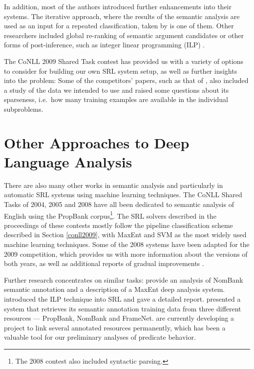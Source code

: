 \documentclass[12pt,notitlepage,a4paper]{report}
\begin{document}
In addition, most of the authors introduced further enhancements into their systems. The iterative approach, where the results of the semantic analysis are used as an input for a repeated classification, taken by \citet{chen09} is one of them. Other researchers included global re-ranking of semantic argument candidates \citep{nugues09} or other forms of post-inference, such as integer linear programming (ILP)  \citep{che09}.

The CoNLL 2009 Shared Task contest has provided us with a variety of options to consider for building our own SRL system setup, as well as further insights into the problem: Some of the competitors' papers, such as that of \citet{zeman09}, also included a study of the data we intended to use and raised some questions about its sparseness, i.e.\ how many training examples are available in the individual subproblems.

\section{Other Approaches to Deep Language Analysis}\label{related-other}

There are also many other works in semantic analysis and particularly in automatic SRL systems using machine learning techniques. The CoNLL Shared Tasks of 2004, 2005 \citep{carreras04,carreras05} and 2008 \citep{surdeanu08} have all been dedicated to semantic analysis of English using the PropBank corpus\footnote{The 2008 contest also included syntactic parsing.}. The SRL solvers described in the proceedings of these contests mostly follow the pipeline classification scheme described in Section \ref{conll2009}, with MaxEnt and SVM as the most widely used machine learning techniques. Some of the 2008 systems have been adapted for the 2009 competition, which provides us with more information about the versions of both years, as well as additional reports of gradual improvements \citep{che08,chen08}.

Further research concentrates on similar tasks: \citet{jiang06} provide an analysis of NomBank \citep{meyers04} semantic annotation and a description of a MaxEnt deep analysis system. \citet{punyakanok04} introduced the ILP technique into SRL and gave a detailed report. \citet{giuglea06} presented a system that retrieves its semantic annotation training data from three different resources --- PropBank, NomBank and FrameNet. \citet{loper07} are currently developing a project to link several annotated resources permanently, which has been a valuable tool for our preliminary analyses of predicate behavior.
\end{document}

